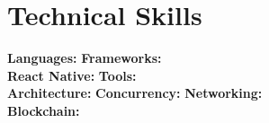 \section{Technical Skills}
\textbf{Languages:} \SkillLanguages{} \quad
\textbf{Frameworks:} \SkillFrameworks{}\\
\textbf{React Native:} \SkillReactNative{} \quad
\textbf{Tools:} \SkillTools{}\\
\textbf{Architecture:} \SkillArchitecture{} \quad
\textbf{Concurrency:} \SkillConcurrency{} \quad
\textbf{Networking:} \SkillNetworking{}\\
\textbf{Blockchain:} \SkillBlockchain{}
